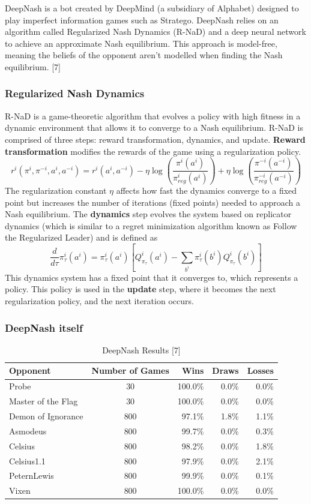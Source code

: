 \documentclass{article}
\begin{document}
DeepNash is a bot created by DeepMind (a subsidiary of Alphabet) designed to play imperfect information games such as Stratego. 
DeepNash relies on an algorithm called Regularized Nash Dynamics (R-NaD) and a deep neural network to achieve an approximate Nash equilibrium. 
This approach is model-free, meaning the beliefs of the opponent aren’t modelled when finding the Nash equilibrium. [7]

\subsubsection{Regularized Nash Dynamics}

R-NaD is a game-theoretic algorithm that evolves a policy with high fitness in a dynamic environment that allows it to converge to a Nash equilibrium. 
R-NaD is comprised of three steps: reward transformation, dynamics, and update. \textbf{Reward transformation} modifies the rewards of the game using a regularization policy. 
$$ r^i(\pi^i, \pi^{-i}, a^i, a^{-i}) = r^i(a^i, a^{-i}) - \eta\log(\frac{\pi^i(a^i)}{\pi_{reg}^i(a^i)}) + \eta\log(\frac{\pi^{-i}(a^{-i})}{\pi_{reg}^{-i}(a^{-i})})$$ 
The regularization constant $\eta$ affects how fast the dynamics converge to a fixed point but increases the number of iterations (fixed points) needed to approach a Nash equilibrium. 
The \textbf{dynamics} step evolves the system based on replicator dynamics (which is similar to a regret minimization algorithm known as Follow the Regularized Leader) and is defined as 
$$ \frac{d}{d\tau} \pi_\tau^i (a^i) = \pi_\tau^i (a^i) [Q_{\pi_\tau}^i(a^i) - \sum_{b^i} \pi_\tau^i (b^i) Q_{\pi_\tau}^i(b^i)]$$ 
This dynamics system has a fixed point that it converges to, which represents a policy. This policy is used in the \textbf{update} step, where it becomes the next regularization policy, and the next iteration occurs. 

\subsubsection{DeepNash itself}

\begin{table}
  \caption{DeepNash Results [7]}
  \label{deepnash-results}
  \centering
  \begin{tabular}{lc|rrr}
    \toprule
    Opponent			& Number of Games 	& Wins & Draws & Losses\\ \midrule
    Probe			& 30	& 100.0\%	& 0.0\%	& 0.0\% \\
    Master of the Flag	& 30	& 100.0\%	& 0.0\%	& 0.0\% \\
    Demon of Ignorance	& 800	& 97.1\%	& 1.8\%	& 1.1\% \\
    Asmodeus			& 800	& 99.7\%	& 0.0\%	& 0.3\% \\
    Celsius			& 800	& 98.2\%	& 0.0\%	& 1.8\% \\
    Celsius1.1 		& 800	& 97.9\%	& 0.0\%	& 2.1\% \\
    PeternLewis		& 800	& 99.9\%	& 0.0\%	& 0.1\% \\
    Vixen			& 800	& 100.0\%	& 0.0\%	& 0.0\% \\
    \bottomrule
  \end{tabular}
\end{table}
\end{document}

